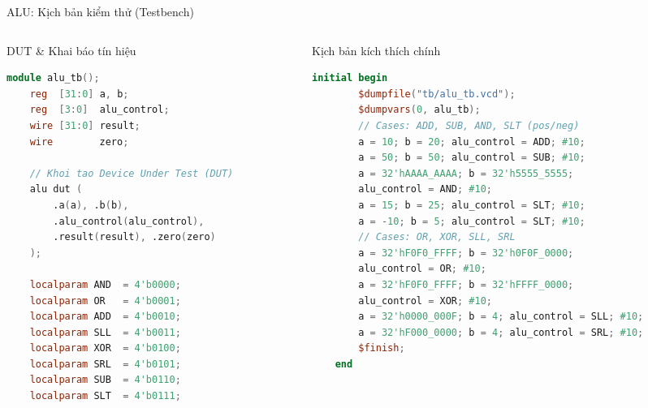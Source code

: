 \begin{frame}[fragile]{ALU: Kịch bản kiểm thử (Testbench)}
    \begin{columns}[t]
        \begin{column}{0.48\textwidth}
            \begin{block}{DUT \& Khai báo tín hiệu}
                \begin{lstlisting}[language=Verilog, basicstyle=\fontsize{6.0pt}{7.0pt}\selectfont\ttfamily, keywordstyle=\color{blue}, commentstyle=\color{gray}]
module alu_tb();
    reg  [31:0] a, b;
    reg  [3:0]  alu_control;
    wire [31:0] result;
    wire        zero;

    // Khoi tao Device Under Test (DUT)
    alu dut (
        .a(a), .b(b),
        .alu_control(alu_control),
        .result(result), .zero(zero)
    );

    localparam AND  = 4'b0000;
    localparam OR   = 4'b0001;
    localparam ADD  = 4'b0010;
    localparam SLL  = 4'b0011;
    localparam XOR  = 4'b0100;
    localparam SRL  = 4'b0101;
    localparam SUB  = 4'b0110;
    localparam SLT  = 4'b0111;
                \end{lstlisting}
            \end{block}
        \end{column}
        
        \begin{column}{0.48\textwidth}
            \begin{block}{Kịch bản kích thích chính}
                \begin{lstlisting}[language=Verilog, basicstyle=\fontsize{6.0pt}{7.0pt}\selectfont\ttfamily, keywordstyle=\color{blue}, commentstyle=\color{gray}]
    initial begin
        $dumpfile("tb/alu_tb.vcd");
        $dumpvars(0, alu_tb);
        // Cases: ADD, SUB, AND, SLT (pos/neg)
        a = 10; b = 20; alu_control = ADD; #10;
        a = 50; b = 50; alu_control = SUB; #10;
        a = 32'hAAAA_AAAA; b = 32'h5555_5555; 
        alu_control = AND; #10;
        a = 15; b = 25; alu_control = SLT; #10;
        a = -10; b = 5; alu_control = SLT; #10;
        // Cases: OR, XOR, SLL, SRL
        a = 32'hF0F0_FFFF; b = 32'h0F0F_0000; 
        alu_control = OR; #10;
        a = 32'hF0F0_FFFF; b = 32'hFFFF_0000; 
        alu_control = XOR; #10;
        a = 32'h0000_000F; b = 4; alu_control = SLL; #10;
        a = 32'hF000_0000; b = 4; alu_control = SRL; #10;
        $finish;
    end
                \end{lstlisting}
            \end{block}
        \end{column}
    \end{columns}
\end{frame}

